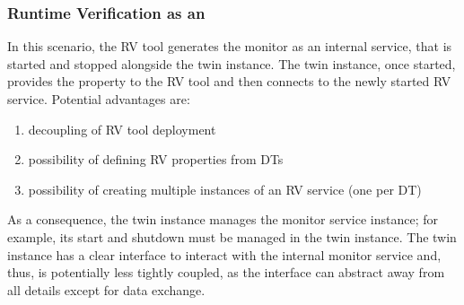 %
%
%
%
%
%
%


\subsubsection{Runtime Verification as an \methodtwo}
In this scenario, the RV tool generates the monitor as an internal service, that is started and stopped alongside the twin instance.
The twin instance, once started, provides the property to the RV tool and then connects to the newly started RV service. Potential advantages are:
\begin{enumerate}
	\item decoupling of RV tool deployment
	\item possibility of defining RV properties from DTs
	\item possibility of creating multiple instances of an RV service (one per DT)
\end{enumerate}%
%
As a consequence, the twin instance manages the monitor service instance; for example, its start and shutdown must be managed in the twin instance.
The twin instance has a clear interface to interact with the internal monitor service and, thus, is potentially less tightly coupled,
as the interface can abstract away from all details except for data exchange.

